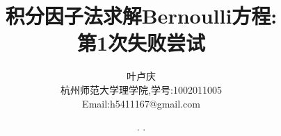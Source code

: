 \documentclass[a4paper, 12pt]{article} %
\makeatletter
\renewcommand{\maketitle}{ %
  \renewcommand\refname{参考文献}
  \newcommand{\D}{\displaystyle}\newcommand{\ri}{\Rightarrow}
  \newcommand{\ds}{\displaystyle} \renewcommand{\ni}{\noindent}
  \newcommand{\pa}{\partial} \newcommand{\Om}{\Omega}
  \newcommand{\om}{\omega} \newcommand{\sik}{\sum_{i=1}^k}
  \newcommand{\vov}{\Vert\omega\Vert} \newcommand{\Umy}{U_{\mu_i,y^i}}
  \newcommand{\lamns}{\lambda_n^{^{\scriptstyle\sigma}}}
  \newcommand{\chiomn}{\chi_{_{\Omega_n}}}
  \newcommand{\ullim}{\underline{\lim}} \newcommand{\bsy}{\boldsymbol}
  \newcommand{\mvb}{\mathversion{bold}} \newcommand{\la}{\lambda}
  \newcommand{\La}{\Lambda} \newcommand{\va}{\varepsilon}
  \newcommand{\be}{\beta} \newcommand{\al}{\alpha}
  \newcommand{\dis}{\displaystyle} \newcommand{\R}{{\mathbb R}}
  \newcommand{\N}{{\mathbb N}} \newcommand{\cF}{{\mathcal F}}
  \newcommand{\gB}{{\mathfrak B}} \newcommand{\eps}{\epsilon}
  \begin{flushright} %
    {\LARGE\@title} %
    
    \vspace{50pt} %
    
    {\large\@author} %
    \\\@date %
    
    \vspace{40pt} %
  \end{flushright}
}
\makeatother
\begin{document}
\title{\textbf{积分因子法求解Bernoulli方程:\\第1次失败尝试}} 
\author{\small{叶卢庆}\\{\small{杭州师范大学理学院,学号:1002011005}}\\{\small{Email:h5411167@gmail.com}}} %
\renewcommand{\today}{\number\year. \number\month. \number\day}
\date{\today} %



\maketitle %






\end{document}
